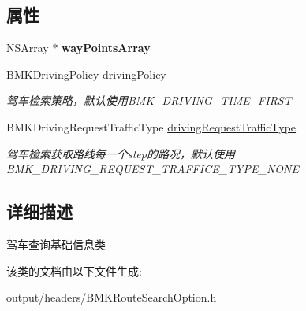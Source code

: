 \subsection*{属性}
\begin{DoxyCompactItemize}
\item 
\hypertarget{interface_b_m_k_driving_route_plan_option_a13b365a390f0ccfc2f2b5d16927eb9db}{}N\+S\+Array $\ast$ {\bfseries way\+Points\+Array}\label{interface_b_m_k_driving_route_plan_option_a13b365a390f0ccfc2f2b5d16927eb9db}

\item 
\hypertarget{interface_b_m_k_driving_route_plan_option_a51fe8957c72c8d0d478515bd7afa0cfd}{}B\+M\+K\+Driving\+Policy \hyperlink{interface_b_m_k_driving_route_plan_option_a51fe8957c72c8d0d478515bd7afa0cfd}{driving\+Policy}\label{interface_b_m_k_driving_route_plan_option_a51fe8957c72c8d0d478515bd7afa0cfd}

\begin{DoxyCompactList}\small\item\em 驾车检索策略，默认使用\+B\+M\+K\+\_\+\+D\+R\+I\+V\+I\+N\+G\+\_\+\+T\+I\+M\+E\+\_\+\+F\+I\+R\+S\+T \end{DoxyCompactList}\item 
\hypertarget{interface_b_m_k_driving_route_plan_option_a89b3bd09b9fbaf62bd06b2309522be1c}{}B\+M\+K\+Driving\+Request\+Traffic\+Type \hyperlink{interface_b_m_k_driving_route_plan_option_a89b3bd09b9fbaf62bd06b2309522be1c}{driving\+Request\+Traffic\+Type}\label{interface_b_m_k_driving_route_plan_option_a89b3bd09b9fbaf62bd06b2309522be1c}

\begin{DoxyCompactList}\small\item\em 驾车检索获取路线每一个step的路况，默认使用\+B\+M\+K\+\_\+\+D\+R\+I\+V\+I\+N\+G\+\_\+\+R\+E\+Q\+U\+E\+S\+T\+\_\+\+T\+R\+A\+F\+F\+I\+C\+E\+\_\+\+T\+Y\+P\+E\+\_\+\+N\+O\+N\+E \end{DoxyCompactList}\end{DoxyCompactItemize}


\subsection{详细描述}
驾车查询基础信息类 

该类的文档由以下文件生成\+:\begin{DoxyCompactItemize}
\item 
output/headers/B\+M\+K\+Route\+Search\+Option.\+h\end{DoxyCompactItemize}

